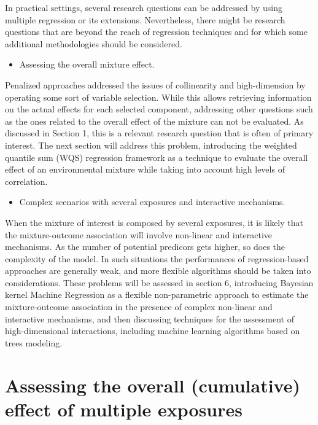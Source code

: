 \documentclass[
]{book}
\providecommand{\tightlist}{%
  \setlength{\itemsep}{0pt}\setlength{\parskip}{0pt}}
\begin{document}
In practical settings, several research questions can be addressed by using multiple regression or its extensions. Nevertheless, there might be research questions that are beyond the reach of regression techniques and for which some additional methodologies should be considered.

\begin{itemize}
\tightlist
\item
  Assessing the overall mixture effect.
\end{itemize}

Penalized approaches addressed the issues of collinearity and high-dimension by operating some sort of variable selection. While this allows retrieving information on the actual effects for each selected component, addressing other questions such as the ones related to the overall effect of the mixture can not be evaluated. As discussed in Section 1, this is a relevant research question that is often of primary interest. The next section will address this problem, introducing the weighted quantile sum (WQS) regression framework as a technique to evaluate the overall effect of an environmental mixture while taking into account high levels of correlation.

\begin{itemize}
\tightlist
\item
  Complex scenarios with several exposures and interactive mechanisms.
\end{itemize}

When the mixture of interest is composed by several exposures, it is likely that the mixture-outcome association will involve non-linear and interactive mechanisms. As the number of potential predicors gets higher, so does the complexity of the model. In such situations the performances of regression-based approaches are generally weak, and more flexible algorithms should be taken into considerations. These problems will be assessed in section 6, introducing Bayesian kernel Machine Regression as a flexible non-parametric approach to estimate the mixture-outcome association in the presence of complex non-linear and interactive mechanisms, and then discussing techniques for the assessment of high-dimensional interactions, including machine learning algorithms based on trees modeling.

\hypertarget{assessing-the-overall-cumulative-effect-of-multiple-exposures}{%
\chapter{Assessing the overall (cumulative) effect of multiple exposures}\label{assessing-the-overall-cumulative-effect-of-multiple-exposures}}
\end{document}
